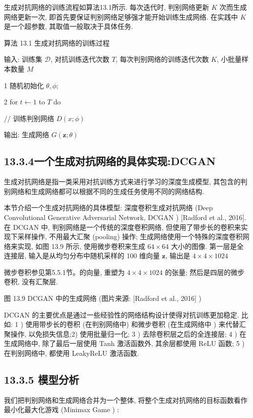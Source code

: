 \documentclass[10pt]{article}
\begin{document}
生成对抗网络的训练流程如算法13.1所示. 每次迭代时, 判别网络更新 $K$ 次而生成网络更新一次, 即首先要保证判别网络足够强才能开始训练生成网络. 在实践中 $K$ 是一个超参数, 其取值一般取决于具体任务.

算法 13.1 生成对抗网络的训练过程

输入: 训练集 $\mathcal{D}$, 对抗训练迭代次数 $T$, 每次判别网络的训练迭代次数 $K$, 小批量样本数量 $M$

1 随机初始化 $\theta, \phi$;

2 for $t \leftarrow 1$ to $T$ do

$/ /$ 训练判别网络 $D(x ; \phi)$

输出: 生成网络 $G(\boldsymbol{z} ; \theta)$

\subsection*{13.3.4一个生成对抗网络的具体实现:DCGAN}
生成对抗网络是指一类采用对抗训练方式来进行学习的深度生成模型, 其包含的判别网络和生成网络都可以根据不同的生成任务使用不同的网络结构.

本节介绍一个生成对抗网络的具体模型: 深度卷积生成对抗网络 (Deep Convolutional Generative Adversarial Network, DCGAN ) [Radford et al., 2016].在 DCGAN 中, 判别网络是一个传统的深度卷积网络, 但使用了带步长的卷积来实现下采样操作, 不用最大汇聚 (pooling) 操作; 生成网络使用一个特殊的深度卷积网络来实现, 如图 13.9 所示, 使用微步卷积来生成 $64 \times 64$ 大小的图像. 第一层是全连接层, 输入是从均匀分布中随机采样的 100 维向量 $\boldsymbol{z}$, 输出是 $4 \times 4 \times 1024$

微步卷积参见第5.5.1节。的向量, 重塑为 $4 \times 4 \times 1024$ 的张量; 然后是四层的微步卷积, 没有汇聚层.



图 13.9 DCGAN 中的生成网络 (图片来源: [Radford et al., 2016] )

DCGAN 的主要优点是通过一些经验性的网络结构设计使得对抗训练更加稳定. 比如: 1 ) 使用带步长的卷积 (在判别网络中) 和微步卷积 (在生成网络中 ) 来代替汇聚操作, 以免损失信息;2) 使用批量归一化; 3 ) 去除卷积层之后的全连接层; 4 ) 在生成网络中, 除了最后一层使用 Tanh 激活函数外, 其余层都使用 ReLU 函数; 5 ) 在判别网络中, 都使用 LeakyReLU 激活函数.

\subsection*{13.3.5 模型分析}
我们把判别网络和生成网络合并为一个整体, 将整个生成对抗网络的目标函数看作最小化最大化游戏 (Minimax Game ) :
\end{document}
